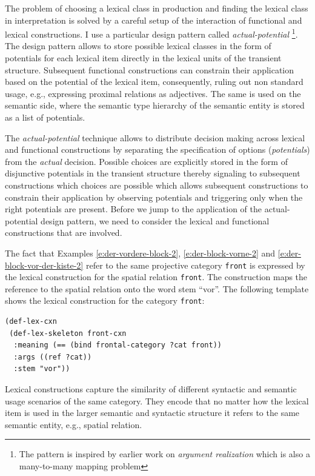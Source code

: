 The problem of choosing a lexical class in production and 
finding the lexical class in interpretation is solved by a careful
setup of the interaction of functional and lexical constructions.
I use a particular design pattern called \emph{actual-potential}
\footnote{The pattern is inspired by earlier work on
\emph{argument realization} \citep{vantrijp2008phd} which is 
also a many-to-many mapping problem}.
The design pattern allows to store possible lexical classes
in the form of potentials for each lexical item directly in the 
lexical units of the transient structure. Subsequent 
functional constructions can constrain their application based on the 
potential of the lexical item, consequently, ruling out 
non standard usage, e.g., expressing proximal relations as adjectives.
The same is used on the semantic side, where the semantic
type hierarchy of the semantic entity is stored as a list of potentials.

The \emph{actual-potential} technique allows to 
distribute decision making across lexical and functional constructions 
by separating the specification of options (\emph{potentials})
from the \emph{actual} decision. Possible choices are
explicitly stored in the form of disjunctive potentials
in the transient structure 
thereby signaling to subsequent constructions which choices are 
possible which allows subsequent constructions to constrain their 
application by observing potentials and triggering only when
the right potentials are present. Before we jump to the 
application of the actual-potential design pattern, we need to 
consider the lexical and functional constructions that are involved.

The fact that Examples \ref{e:der-vordere-block-2}, 
\ref{e:der-block-vorne-2} and \ref{e:der-block-vor-der-kiste-2} 
refer to the same projective category {\footnotesize\tt front} is expressed 
by the lexical construction for the spatial relation {\footnotesize\tt front}.
The construction maps the reference to the spatial relation onto 
the word stem ``vor''. The following template shows the lexical 
construction for the category {\footnotesize\tt front}:
\begin{example}
\label{e:def-lex-front}
\begin{footnotesize}
\begin{Verbatim}[commandchars=\\\{\}]
(def-lex-cxn
 (def-lex-skeleton front-cxn 
  :meaning (== (bind frontal-category ?cat front)) 
  :args ((ref ?cat))
  :stem "vor"))
\end{Verbatim}
\end{footnotesize}
\end{example}
Lexical constructions capture the similarity of different syntactic and
semantic usage scenarios of the same category. They encode
that no matter how the lexical item is used in the larger
semantic and syntactic structure it refers to the same
semantic entity, e.g., spatial relation.

